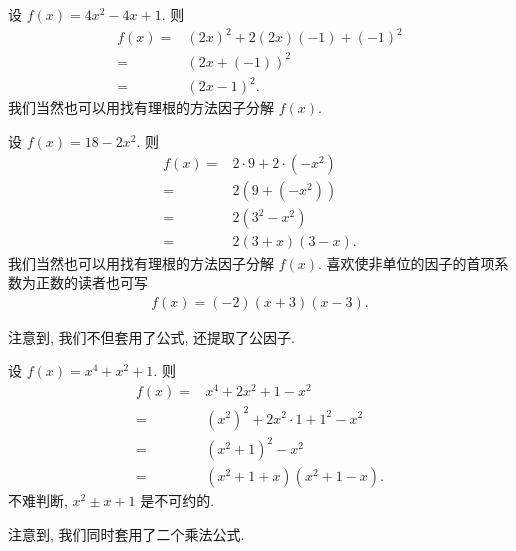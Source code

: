 \begin{example}
    设 $f(x) = 4x^2 - 4x + 1$. 则
    \begin{align*}
        f(x)
        = {} & (2x)^2 + 2 (2x) (-1) + (-1)^2 \\
        = {} & (2x + (-1))^2                 \\
        = {} & (2x - 1)^2.
    \end{align*}
    我们当然也可以用找有理根的方法因子分解 $f(x)$.
\end{example}

\begin{example}
    设 $f(x) = 18 - 2x^2$. 则
    \begin{align*}
        f(x)
        = {} & 2 \cdot 9 + 2 \cdot (-x^2) \\
        = {} & 2(9 + (-x^2))              \\
        = {} & 2(3^2 - x^2)               \\
        = {} & 2(3 + x)(3 - x).
    \end{align*}
    我们当然也可以用找有理根的方法因子分解 $f(x)$. 喜欢使非单位的因子的首项系数为正数的读者也可写
    \begin{align*}
        f(x) = (-2) (x + 3) (x - 3).
    \end{align*}

    注意到, 我们不但套用了公式, 还提取了公因子.
\end{example}

\begin{example}
    设 $f(x) = x^4 + x^2 + 1$. 则
    \begin{align*}
        f(x)
        = {} & x^4 + 2x^2 + 1 - x^2               \\
        = {} & (x^2)^2 + 2x^2 \cdot 1 + 1^2 - x^2 \\
        = {} & (x^2 + 1)^2 - x^2                  \\
        = {} & (x^2 + 1 + x) (x^2 + 1 - x).
    \end{align*}
    不难判断, $x^2 \pm x + 1$ 是不可约的.

    注意到, 我们同时套用了二个乘法公式.
\end{example}

